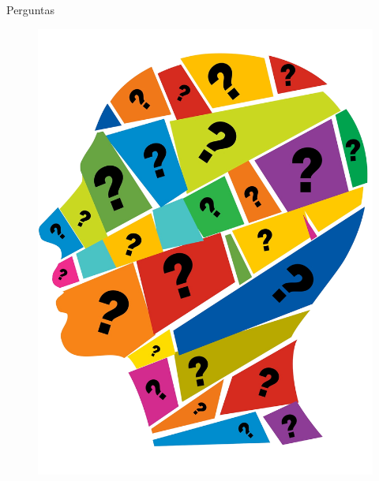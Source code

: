 \documentclass{beamer}
\begin{document}
%

\begin{frame}{Perguntas}
    \begin{figure}
        \centering
        \includegraphics[height=\textheight]{figs/perguntas.png}
    \end{figure}
\end{frame}
\end{document}
